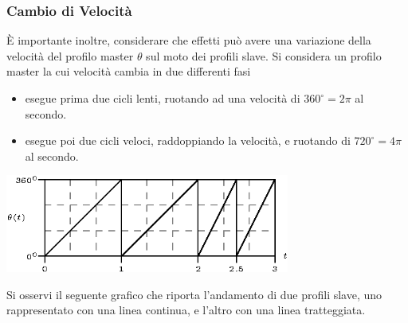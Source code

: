 \documentclass[10pt, letterpaper]{report}
\begin{document}
\subsubsection{Cambio di Velocità}
È importante inoltre, considerare che effetti può avere una variazione della velocità del profilo master $\theta$ sul moto dei profili slave. Si considera un profilo master la cui velocità cambia in due differenti fasi \begin{itemize}
    \item esegue prima due cicli lenti, ruotando ad una velocità di $360^\circ=2\pi$ al secondo. 
    \item esegue poi due cicli veloci, raddoppiando la velocità, e ruotando di $720^\circ=4\pi$ al secondo.
\end{itemize}
\begin{center}
        \includegraphics[width=0.7\textwidth]{images/cambioVel.eps}
\end{center}
Si osservi il seguente grafico che riporta l'andamento di due profili slave, uno rappresentato con una linea continua, e l'altro con una linea tratteggiata.
\end{document}
